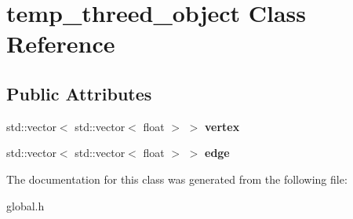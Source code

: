 \hypertarget{classtemp__threed__object}{}\section{temp\+\_\+threed\+\_\+object Class Reference}
\label{classtemp__threed__object}
\subsection*{Public Attributes}
\begin{DoxyCompactItemize}
\item 
\mbox{\label{classtemp__threed__object_a1e3d1e945a9854463d9a20266edbb58a}} 
std\+::vector$<$ std\+::vector$<$ float $>$ $>$ {\bfseries vertex}
\item 
\mbox{\label{classtemp__threed__object_ab94990f4b81544129c6712a595fbf4d4}} 
std\+::vector$<$ std\+::vector$<$ float $>$ $>$ {\bfseries edge}
\end{DoxyCompactItemize}


The documentation for this class was generated from the following file\+:\begin{DoxyCompactItemize}
\item 
global.\+h\end{DoxyCompactItemize}
